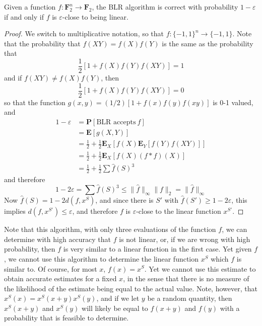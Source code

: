 \begin{theorem}
    Given a function $f: \mathbf{F}_2^n \to \mathbf{F}_2$, the BLR algorithm is correct with probability $1 - \varepsilon$ if and only if $f$ is $\varepsilon$-close to being linear.
\end{theorem}
\begin{proof}
    We switch to multiplicative notation, so that $f: \{ -1, 1 \}^n \to \{ -1, 1 \}$. Note that the probability that $f(XY) = f(X)f(Y)$ is the same as the probability that
    \[ \frac{1}{2} [1 + f(X)f(Y)f(XY)] = 1 \]
    and if $f(XY) \neq f(X) f(Y)$, then
    \[ \frac{1}{2} [1 + f(X)f(Y)f(XY)] = 0 \]
    so that the function $g(x,y) = (1/2)[1 + f(x)f(y)f(xy)]$ is 0-1 valued, and
    \begin{align*}
        1 - \varepsilon &= \mathbf{P}[\text{BLR accepts}\ f]\\
        &= \mathbf{E}[g(X,Y)]\\
        &= \frac{1}{2} + \frac{1}{2} \mathbf{E}_X[f(X) \mathbf{E}_Y[f(Y) f(XY)]]\\
        &= \frac{1}{2} + \frac{1}{2} \mathbf{E}_X[f(X) (f * f)(X)]\\
        &= \frac{1}{2} + \frac{1}{2} \sum \widehat{f}(S)^3
    \end{align*}
    and therefore
    \[ 1 - 2 \varepsilon = \sum \widehat{f}(S)^3 \leq \| \widehat{f} \|_\infty \| f \|_2 = \| \widehat{f} \|_\infty \]
    Now $\widehat{f}(S) = 1 - 2 d(f, x^S)$, and since there is $S'$ with $\widehat{f}(S') \geq 1 - 2 \varepsilon$, this implies $d(f, x^{S'}) \leq \varepsilon$, and therefore $f$ is $\varepsilon$-close to the linear function $x^{S'}$.
\end{proof}

Note that this algorithm, with only three evaluations of the function $f$, we can determine with high accuracy  that $f$ is not linear, or, if we are wrong with high probability, then $f$ is very similar to a linear function in the first case. Yet given $f$, we cannot use this algorithm to determine the linear function $x^S$ which $f$ is similar to. Of course, for most $x$, $f(x) = x^S$. Yet we cannot use this estimate to obtain accurate estimates for a fixed $x$, in the sense that there is no measure of the likelihood of the estimate being equal to the actual value. Note, however, that $x^S(x) = x^S(x + y)x^S(y)$, and if we let $y$ be a random quantity, then $x^S(x + y)$ and $x^S(y)$ will likely be equal to $f(x + y)$ and $f(y)$ with a probability that is feasible to determine.

